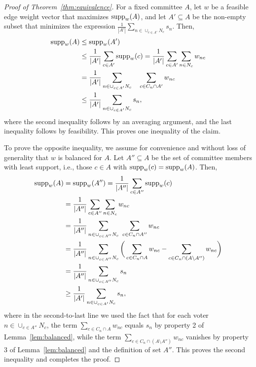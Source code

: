 \begin{proof}[Proof of Theorem~\ref{thm:equivalence}]
For a fixed committee $A$, let $w$ be a feasible edge weight vector that maximizes $\operatorname{supp}_w(A)$, and let $A'\subseteq A$ be the non-empty subset that minimizes the expression $\frac{1}{|A'|} \sum_{n\in \cup_{c\in A'} N_c} s_n$. Then, 
\begin{align*}
    \operatorname{supp}_w(A) &\leq \operatorname{supp}_w(A') \\
		& \leq \frac{1}{|A'|} \sum_{c\in A'} \operatorname{supp}_w(c) = \frac{1}{|A'|} \sum_{c\in A'} \sum_{n\in N_c} w_{nc} \\ 
    & = \frac{1}{|A'|}  \sum_{n\in \cup_{c\in A'} N_c} \quad \sum_{c\in C_n\cap A'} w_{nc} \\
    & \leq \frac{1}{|A'|} \sum_{n\in \cup_{c\in A'} N_c} s_n,
\end{align*}
%
where the second inequality follows by an averaging argument, and the last inequality follows by feasibility. 
This proves one inequality of the claim. 

To prove the opposite inequality, we assume for convenience and without loss of generality that $w$ is balanced for $A$. 
Let $A''\subseteq A$ be the set of committee members with least support, i.e., those $c\in A$ with $\operatorname{supp}_w(c)=\operatorname{supp}_w(A)$. Then,
\begin{align*}
    \operatorname{supp}_w(A) &= \operatorname{supp}_w(A'') = \frac{1}{|A''|} \sum_{c\in A''} \operatorname{supp}_w(c) \\
		& = \frac{1}{|A''|} \sum_{c\in A''} \sum_{n\in N_c} w_{nc} \\
    &= \frac{1}{|A''|} \sum_{n\in \cup_{c\in A''} N_c} \ \sum_{c\in C_n\cap A''} w_{nc} \\
    &= \frac{1}{|A''|} \sum_{n\in \cup_{c\in A''} N_c} \bigg( \sum_{c\in C_n\cap A} w_{nc} 
		- \sum_{c\in C_n \cap (A\setminus A'')} w_{nc}\bigg)\\
		&= \frac{1}{|A''|}\sum_{n\in \cup_{c\in A''} N_c} s_n \\
		&\geq \frac{1}{|A'|}\sum_{n\in \cup_{c\in A'}N_c} s_n,
\end{align*}
%
where in the second-to-last line we used the fact that for each voter $n\in \cup_{c\in A''} N_c$, the term $\sum_{c\in C_n\cap A} w_{nc}$ equals $s_n$ by property 2 of Lemma~\ref{lem:balanced}, while the term $\sum_{c\in C_n \cap (A\setminus A'')} w_{nc}$ vanishes by property 3 of Lemma~\ref{lem:balanced} and the definition of set $A''$. 
This proves the second inequality and completes the proof.
\end{proof}


